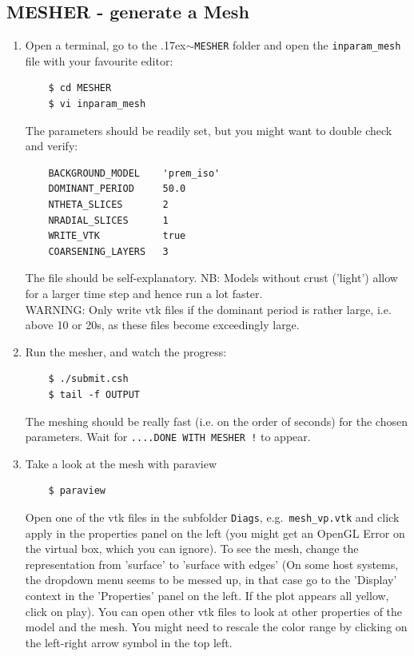 \documentclass{article}
\newcommand{\ttilde}[0]{\raise.17ex\hbox{$\scriptstyle\sim$}}
\begin{document}
\subsection{MESHER - generate a Mesh}

\begin{enumerate}
    \item Open a terminal, go to the \ttilde\verb|MESHER| folder and open
    the \verb|inparam_mesh| file with your favourite editor:
    \begin{verbatim}
    $ cd MESHER
    $ vi inparam_mesh
    \end{verbatim}
    The parameters should be readily set, but you might want to double check and verify:
    \begin{verbatim}
    BACKGROUND_MODEL    'prem_iso'
    DOMINANT_PERIOD     50.0
    NTHETA_SLICES       2
    NRADIAL_SLICES      1 
    WRITE_VTK           true
    COARSENING_LAYERS   3
    \end{verbatim}
    The file should be self-explanatory. NB: Models without crust ('light') allow for a
    larger time step and hence run a lot faster. \\
    WARNING: Only write vtk files if the dominant period is rather large, i.e. above 10 or
    20s, as these files become exceedingly large.

    \item Run the mesher, and watch the progress:
    \begin{verbatim}
    $ ./submit.csh
    $ tail -f OUTPUT
    \end{verbatim}
    The meshing should be really fast (i.e. on the order of seconds) for the chosen parameters. Wait for 
    \verb|....DONE WITH MESHER !| to appear.

    \item Take a look at the mesh with paraview
    \begin{verbatim}
    $ paraview
    \end{verbatim}
    Open one of the vtk files in the subfolder \verb|Diags|, e.g.\
    \verb|mesh_vp.vtk| and click apply in the properties panel on the left (you
    might get an OpenGL Error on the virtual box, which you can ignore). To see
    the mesh, change the representation from 'surface' to 'surface with edges'
    (On some host systems, the dropdown menu seems to be messed up, in that
    case go to the 'Display' context in the 'Properties' panel on the left. If
    the plot appears all yellow, click on play).  You can open other vtk files
    to look at other properties of the model and the mesh. You might need to
    rescale the color range by clicking on the left-right arrow symbol in the
    top left.


\end{enumerate}
\end{document}
